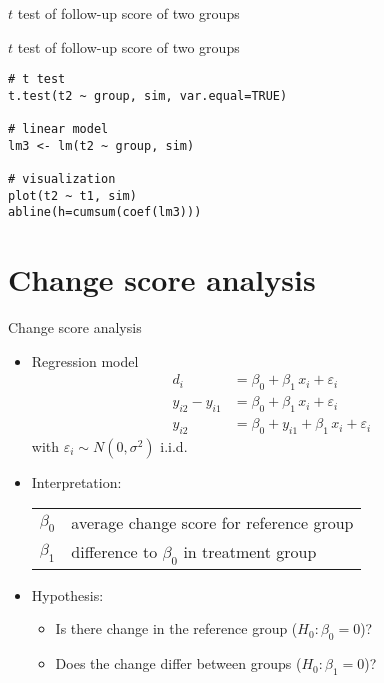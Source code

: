 \documentclass[aspectratio=169]{beamer}
\begin{document}
\begin{frame}{$t$ test of follow-up score of two groups}
\begin{center}
\end{center}
\end{frame}

{

\begin{frame}[fragile]{$t$ test of follow-up score of two groups}
\begin{lstlisting}
# t test
t.test(t2 ~ group, sim, var.equal=TRUE)

# linear model
lm3 <- lm(t2 ~ group, sim)

# visualization
plot(t2 ~ t1, sim)
abline(h=cumsum(coef(lm3)))
\end{lstlisting}
\end{frame}

}

\section{Change score analysis}

\begin{frame}{Change score analysis}
\begin{itemize}
  \item Regression model
    \begin{align*}
                  d_i &= \beta_0 + \beta_1 \, x_i + \varepsilon_i \\
      y_{i2} - y_{i1} &= \beta_0 + \beta_1 \, x_i + \varepsilon_i \\
               y_{i2} &= \beta_0 + y_{i1} + \beta_1 \, x_i + \varepsilon_i
    \end{align*}
    with $\varepsilon_i \sim N(0, \sigma^2)$ i.i.d.
  \item Interpretation:
    \begin{tabular}{lp{10cm}}
    $\beta_0$ & average change score for reference group\\
    $\beta_1$ & difference to $\beta_0$ in treatment group
    \end{tabular}
  \item Hypothesis:
    \begin{itemize}
        \item Is there change in the reference group ($H_0\colon \beta_0 = 0$)?
        \item Does the change differ between groups ($H_0\colon \beta_1 =0$)?
    \end{itemize}
\end{itemize}
\end{frame}
\end{document}
